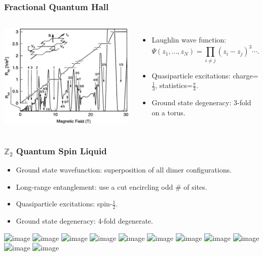 \documentclass[xcolor=table, 10pt, aspectratio=169]{beamer}
\begin{document}
\begin{frame}
\frametitle{Fractional Quantum Hall}
\begin{columns}
  \begin{center}
  \includegraphics[width=\columnwidth]{../resources/fqhe}
  \end{center}
  \begin{itemize}
  \item Laughlin wave function:
  \[\Psi(z_1,\ldots,z_N)=\prod_{i\neq j}(z_i-z_j)^3\cdots.\]
  \item Quasiparticle excitations: charge=$\frac13$, statistics=$\frac\pi3$.
  \item Ground state degeneracy: 3-fold on a torus.
  \end{itemize}
\end{columns}
\end{frame}

\begin{frame}
\frametitle{$\mathbb Z_2$ Quantum Spin Liquid}
\begin{itemize}
\item<1-> Ground state wavefunction: superposition of all dimer configurations.
\item<3-> Long-range entanglement: use a cut encircling odd \# of sites.
\item<4-> Quasiparticle excitations: spin-$\frac12$.
\item<9-> Ground state degeneracy: 4-fold degenerate.
\end{itemize}
\begin{center}
\includegraphics<1>{../dimer/dimer_spin}
\includegraphics<2>{../dimer/dimer0}
\includegraphics<3>{../dimer/dimerloop}
\includegraphics<4>{../dimer/dimer1}
\includegraphics<5>{../dimer/dimer2}
\includegraphics<6>{../dimer/dimer3}
\includegraphics<7>{../dimer/dimer4}
\includegraphics<8>{../dimer/dimer5}
\includegraphics<9>{../dimer/dimer_cut}
\includegraphics<10>{../dimer/dimer_cut2}
\includegraphics<11>{../dimer/dimer_cut3}
\end{center}
\end{frame}
\end{document}

